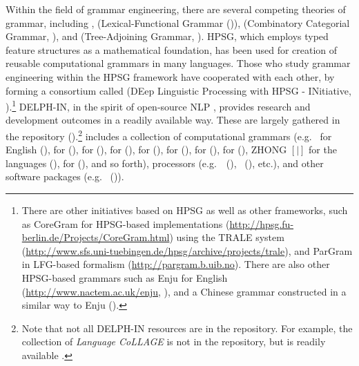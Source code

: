 Within the field of grammar engineering, there are several competing
theories of grammar, including , 
(Lexical-Functional Grammar (\citealt{bresnan:01})), 
(Combinatory Categorial Grammar, \citealt{steedman:01}), and 
(Tree-Adjoining Grammar, \citealt{joshi:schabes:97}). HPSG, which
employs typed feature structures as a mathematical foundation, has
been used for creation of reusable computational grammars in many
languages. Those who study grammar engineering within the HPSG
framework have cooperated with each other, by forming a consortium
called  (DEep Linguistic Processing with HPSG -
INitiative, ).\footnote{There are other
  initiatives based on HPSG as well as other frameworks, such as
  CoreGram for HPSG-based implementations
  (\url{http://hpsg.fu-berlin.de/Projects/CoreGram.html}) using the
  TRALE system
  (\url{http://www.sfs.uni-tuebingen.de/hpsg/archive/projects/trale}),
  and ParGram in LFG-based formalism
  (\url{http://pargram.b.uib.no}). There are also other HPSG-based
  grammars such as Enju for English
  (\url{http://www.nactem.ac.uk/enju}, \citealt{miyao:tsujii:08}), and
  a Chinese grammar constructed in a similar way to Enju
  (\citealt{yu:etal:10}).}  DELPH-IN, in the spirit of open-source NLP
\citep{pedersen:08}, provides research and development outcomes in a
readily available way. These are largely gathered in the \logon
repository ().\footnote{Note
  that not all DELPH-IN resources are in the \logon repository. For
  example, the collection of \textit{Language CoLLAGE} is not in the
  repository, but is readily available \citep{bender:14}.} \logon
includes a collection of computational grammars (e.g.\  for
English (\citealt{flickinger:00}),  for 
(\citealt{siegel:bender:02}),  for 
(\citealt{kim:etal:11}),  for 
(\citealt{crysmann:03,crysmann:05a,crysmann:05b}),  for
 (\citealt{marimon:12}),  for
 (\citealt{branco:costa:10}),  for
 (\citealt{hellan:05}),  for
 (\citealt{osenova:11}), ZHONG \ensuremath{[\big|]} for
the  languages (\citealt{fan:15a,fan:15b}),
 for  (\citealt{moeljadi:15}), and so
forth), processors (e.g.\ \isi{\lkb}~(\citealt{copestake:02}),
\isi{\pet}~(\citealt{callmeier:00}), etc.), and other software
packages (e.g.\ \isi{\itsdb} (\citealt{oepen:01})).





